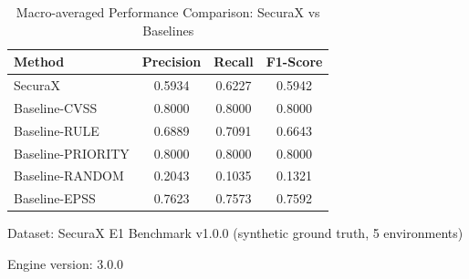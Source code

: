 \begin{table}[htbp]
\centering
\caption{Macro-averaged Performance Comparison: SecuraX vs Baselines}
\label{tab:macro_comparison}
\begin{tabular}{lccc}
\hline
\textbf{Method} & \textbf{Precision} & \textbf{Recall} & \textbf{F1-Score} \\
\hline
SecuraX & 0.5934 & 0.6227 & 0.5942 \\
Baseline-CVSS & 0.8000 & 0.8000 & 0.8000 \\
Baseline-RULE & 0.6889 & 0.7091 & 0.6643 \\
Baseline-PRIORITY & 0.8000 & 0.8000 & 0.8000 \\
Baseline-RANDOM & 0.2043 & 0.1035 & 0.1321 \\
Baseline-EPSS & 0.7623 & 0.7573 & 0.7592 \\
\hline
\end{tabular}
\begin{tablenotes}
\small
\item Dataset: SecuraX E1 Benchmark v1.0.0 (synthetic ground truth, 5 environments)
\item Engine version: 3.0.0
\end{tablenotes}
\end{table}
